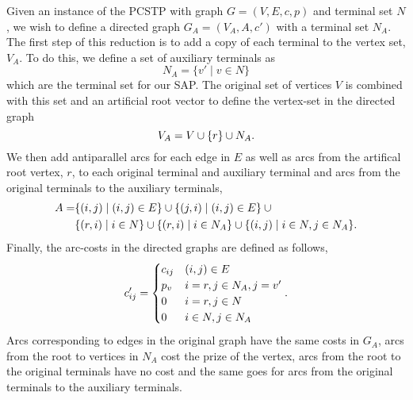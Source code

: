 Given an instance of the PCSTP with graph $G = (V,E,c,p)$ and terminal set $N$, we wish to define
 a directed graph $G_A = (V_A, A, c')$ with a terminal set $N_A$. The first
 step of this reduction is to add a copy of each terminal to the vertex set, $V_A$.
 To do this, we define a
set of auxiliary terminals as
$$N_A = \{v' \mid v \in N\}$$
which are the terminal set for our SAP.
The original set of vertices $V$ is combined with this set and an
artificial root vector to define the vertex-set in the directed graph
$$V_A = V \cup \{r\} \cup N_A\mathnormal{.}$$
We then add antiparallel arcs for each edge in $E$ as well as arcs from the artifical root vertex, $r$,
to each original terminal and auxiliary terminal and arcs from the original terminals to the auxiliary
terminals,
\begin{align*}
A = &\{(i,j) \mid (i,j) \in E \} \cup \{ (j,i) \mid (i,j) \in E \} \:\cup \\
&\{(r, i) \mid i \in N\} \cup \{(r,i) \mid i \in N_A\} \cup \{(i,j) \mid i \in N, j \in N_A\}\mathnormal{.}
\end{align*}
Finally, the arc-costs in the directed graphs are defined as follows,
$$c'_{ij} =
\begin{cases}
  c_{ij} & (i,j) \in E \\
  p_v & i = r, j \in N_A , j = v' \\
  0 & i = r, j \in N \\
  0 & i \in N, j \in N_A
\end{cases}\textnormal{.}$$
Arcs corresponding to edges in the original graph have the same costs in $G_A$, arcs from the root
to vertices in $N_A$ cost the prize of the vertex, arcs from the root to the original terminals
have no cost and the same goes for arcs from the original terminals to the auxiliary terminals.

